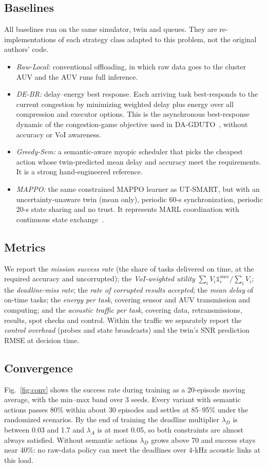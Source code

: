 \documentclass[lettersize,journal]{IEEEtran}
\begin{document}
\subsection{Baselines}
All baselines run on the same simulator, twin and queues. They are re-implementations of each strategy class adapted to this problem, not the original authors' code.
\begin{itemize}
\item \emph{Raw-Local:} conventional offloading, in which raw data goes to the cluster AUV and the AUV runs full inference.
\item \emph{DE-BR:} delay--energy best response. Each arriving task best-responds to the current congestion by minimizing weighted delay plus energy over all compression and executor options. This is the asynchronous best-response dynamic of the congestion-game objective used in DA-GDUTO~\cite{shu2026offload}, without accuracy or VoI awareness.
\item \emph{Greedy-Sem:} a semantic-aware myopic scheduler that picks the cheapest action whose twin-predicted mean delay and accuracy meet the requirements. It is a strong hand-engineered reference.
\item \emph{MAPPO:} the same constrained MAPPO learner as UT-SMART, but with an uncertainty-unaware twin (mean only), periodic 60-s synchronization, periodic 20-s state sharing and no trust. It represents MARL coordination with continuous state exchange~\cite{song2025dtna,lin2025madac}.
\end{itemize}

\subsection{Metrics}
We report the \emph{mission success rate} (the share of tasks delivered on time, at the required accuracy and uncorrupted); the \emph{VoI-weighted utility} $\sum_i V_i\mathbb{1}^{\mathrm{succ}}_i/\sum_i V_i$; the \emph{deadline-miss rate}; the \emph{rate of corrupted results accepted}; the \emph{mean delay} of on-time tasks; the \emph{energy per task}, covering sensor and AUV transmission and computing; and the \emph{acoustic traffic per task}, covering data, retransmissions, results, spot checks and control. Within the traffic we separately report the \emph{control overhead} (probes and state broadcasts) and the twin's SNR prediction RMSE at decision time.

\subsection{Convergence}
Fig.~\ref{fig:conv} shows the success rate during training as a 20-episode moving average, with the min--max band over 3 seeds. Every variant with semantic actions passes 80\% within about 30 episodes and settles at 85--95\% under the randomized scenarios. By the end of training the deadline multiplier $\lambda_D$ is between 0.03 and 1.7 and $\lambda_A$ is at most 0.05, so both constraints are almost always satisfied. Without semantic actions $\lambda_D$ grows above 70 and success stays near 40\%: no raw-data policy can meet the deadlines over 4-kHz acoustic links at this load.
\end{document}
